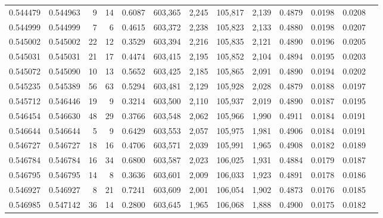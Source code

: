 \begin{tabular}{rrrrrrrrrrrrr}
0.544479 & 0.544963 &     9 &    14 &                                     0.6087 & 603,365 &   2,245 & 105,817 &   2,139 & 0.4879 & 0.0198 & 0.0208 \\
0.544999 & 0.544999 &     7 &     6 &                                     0.4615 & 603,372 &   2,238 & 105,823 &   2,133 & 0.4880 & 0.0198 & 0.0207 \\
0.545002 & 0.545002 &    22 &    12 &                                     0.3529 & 603,394 &   2,216 & 105,835 &   2,121 & 0.4890 & 0.0196 & 0.0205 \\
0.545031 & 0.545031 &    21 &    17 &                                     0.4474 & 603,415 &   2,195 & 105,852 &   2,104 & 0.4894 & 0.0195 & 0.0203 \\
0.545072 & 0.545090 &    10 &    13 &                                     0.5652 & 603,425 &   2,185 & 105,865 &   2,091 & 0.4890 & 0.0194 & 0.0202 \\
0.545235 & 0.545389 &    56 &    63 &                                     0.5294 & 603,481 &   2,129 & 105,928 &   2,028 & 0.4879 & 0.0188 & 0.0197 \\
0.545712 & 0.546446 &    19 &     9 &                                     0.3214 & 603,500 &   2,110 & 105,937 &   2,019 & 0.4890 & 0.0187 & 0.0195 \\
0.546454 & 0.546630 &    48 &    29 &                                     0.3766 & 603,548 &   2,062 & 105,966 &   1,990 & 0.4911 & 0.0184 & 0.0191 \\
0.546644 & 0.546644 &     5 &     9 &                                     0.6429 & 603,553 &   2,057 & 105,975 &   1,981 & 0.4906 & 0.0184 & 0.0191 \\
0.546727 & 0.546727 &    18 &    16 &                                     0.4706 & 603,571 &   2,039 & 105,991 &   1,965 & 0.4908 & 0.0182 & 0.0189 \\
0.546784 & 0.546784 &    16 &    34 &                                     0.6800 & 603,587 &   2,023 & 106,025 &   1,931 & 0.4884 & 0.0179 & 0.0187 \\
0.546795 & 0.546795 &    14 &     8 &                                     0.3636 & 603,601 &   2,009 & 106,033 &   1,923 & 0.4891 & 0.0178 & 0.0186 \\
0.546927 & 0.546927 &     8 &    21 &                                     0.7241 & 603,609 &   2,001 & 106,054 &   1,902 & 0.4873 & 0.0176 & 0.0185 \\
0.546985 & 0.547142 &    36 &    14 &                                     0.2800 & 603,645 &   1,965 & 106,068 &   1,888 & 0.4900 & 0.0175 & 0.0182 \\

\end{tabular}
